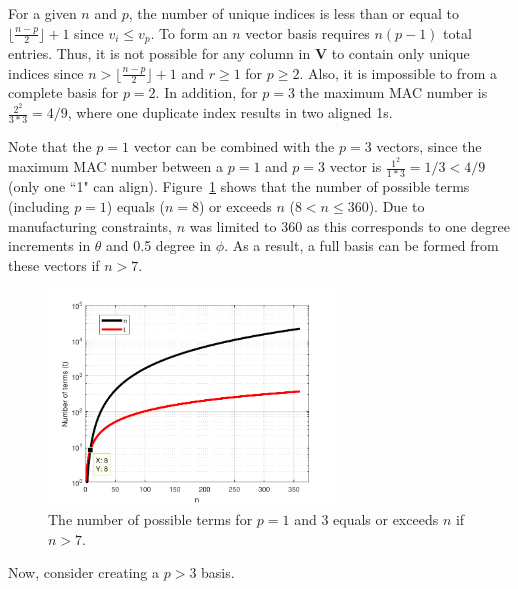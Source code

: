 \documentclass[3p,times]{elsarticle}
\begin{document}
For a given $n$ and $p$, the number of unique indices is less than or equal to $\lfloor \frac{n-p}{2}\rfloor+1$ since $v_i\le v_p$.  
To form an $n$ vector basis requires $n\left(p-1\right)$ total entries.  
Thus, it is not possible for any column in $\textbf{V}$ to contain only unique indices since $n>\lfloor \frac{n-p}{2}\rfloor+1$ and $r\ge 1$ for $p\ge2$.  
Also, it is impossible to from a complete basis for $p=2$.  
In addition, for $p=3$ the maximum MAC number is $\frac{2^2}{3*3}=4/9$, where one duplicate index results in two aligned 1s.

Note that the $p=1$ vector can be combined with the $p=3$ vectors, since the maximum MAC number between a $p=1$ and $p=3$ vector is $\frac{1^2}{1*3}=1/3 < 4/9$ (only one ``1" can align).  
Figure~\ref{fig:terms} shows that the number of possible terms (including $p=1$) equals ($n=8$) or exceeds $n$ ($8<n\le 360$).  
Due to manufacturing constraints, $n$ was limited to 360 as this corresponds to one degree increments in $\theta$ and 0.5 degree in $\phi$.  
As a result, a full basis can be formed from these vectors if $n>7$.

\begin{figure}[ht!]
\includegraphics[width={3.0in}]{../figs/TermPlot.pdf}
\centering
\caption{The number of possible terms for $p=1$ and 3 equals or exceeds $n$ if $n>7$.}
\label{fig:terms}
\end{figure}

Now, consider creating a $p>3$ basis.  

\end{document}
